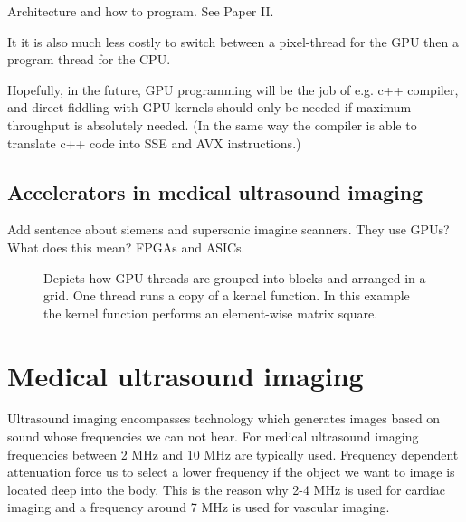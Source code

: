 Architecture and how to program. See Paper II.

It it is also much less costly to switch between a pixel-thread for the GPU then a program thread for the CPU. 

Hopefully, in the future, GPU programming will be the job of e.g. c++ compiler, and direct fiddling with GPU kernels should only be needed if maximum throughput is absolutely needed. (In the same way the compiler is able to translate c++ code into SSE and AVX instructions.)

\subsection{Accelerators in medical ultrasound imaging }
Add sentence about siemens and supersonic imagine scanners. They use GPUs? What does this mean? FPGAs and ASICs.

\begin{figure}
\centering
{}
\caption{Depicts how GPU threads are grouped into blocks and arranged in a grid. One thread runs a copy of a kernel function. In this example the kernel function performs an element-wise matrix square.}
\label{fig:gpu_grid}
\end{figure}

\section {Medical ultrasound imaging}\label{sec:ultrasound}
Ultrasound imaging encompasses technology which generates images based on sound whose frequencies we can not hear. For medical ultrasound imaging frequencies between 2 MHz and 10 MHz are typically used. Frequency dependent attenuation force us to select a lower frequency if the object we want to image is located deep into the body. This is the reason why 2-4 MHz is used for cardiac imaging and a frequency around 7 MHz is used for vascular imaging.

